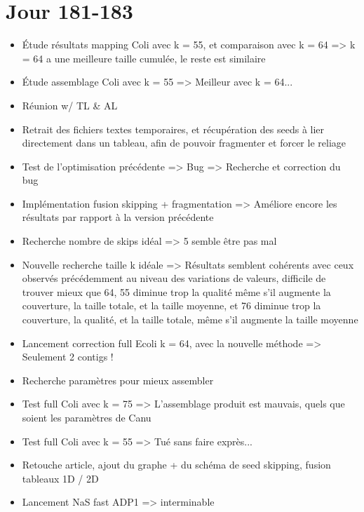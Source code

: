 \documentclass[12pt]{report}
\begin{document}
\section{Jour 181-183}

\begin{itemize}
	\item Étude résultats mapping Coli avec k = 55, et comparaison avec k = 64 => k = 64 a une meilleure taille cumulée, le reste est similaire
	
	\item Étude assemblage Coli avec k = 55 => Meilleur avec k = 64...
	
	\item Réunion w/ TL \& AL
	
	\item Retrait des fichiers textes temporaires, et récupération des seeds à lier directement dans un tableau, afin de pouvoir fragmenter et forcer
		  le reliage
	
	\item Test de l'optimisation précédente => Bug => Recherche et correction du bug
	
	\item Implémentation fusion skipping + fragmentation => Améliore encore les résultats par rapport à la version précédente
	
	\item Recherche nombre de skips idéal => 5 semble être pas mal
	
	\item Nouvelle recherche taille k idéale => Résultats semblent cohérents avec ceux observés précédemment au niveau
		  des variations de valeurs, difficile de trouver mieux que 64, 55 diminue trop la qualité même s'il augmente la couverture, 
		  la taille totale,
		  et la taille moyenne, et 76 diminue trop la couverture, la qualité, et la taille totale, même s'il augmente la taille moyenne
		  
	\item Lancement correction full Ecoli k = 64, avec la nouvelle méthode => Seulement 2 contigs !
	
	\item Recherche paramètres pour mieux assembler
	
	\item Test full Coli avec k = 75 => L'assemblage produit est mauvais, quels que soient les paramètres de Canu
	
	\item Test full Coli avec k = 55 => Tué sans faire exprès...
	
	\item Retouche article, ajout du graphe + du schéma de seed skipping, fusion tableaux 1D / 2D
	
	\item Lancement NaS fast ADP1 => interminable
\end{itemize}
\end{document}
